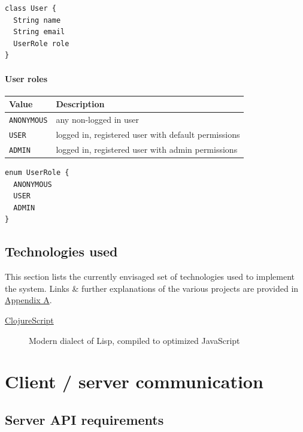 \documentclass[letterpaper, 9pt, onecolumn, twoside, technote, final]{IEEEtran}
\begin{document}
\lstset{language=plantuml,label= ,caption= ,captionpos=b,numbers=none}
\begin{lstlisting}
class User {
  String name
  String email
  UserRole role
}
\end{lstlisting}

\paragraph{User roles}
\label{sec:orgaaad5df}

\begin{center}
\begin{tabular}{ll}
\textbf{Value} & \textbf{Description}\\
\hline
\texttt{ANONYMOUS} & any non-logged in user\\
\texttt{USER} & logged in, registered user with default permissions\\
\texttt{ADMIN} & logged in, registered user with admin permissions\\
\end{tabular}
\end{center}

\lstset{language=plantuml,label= ,caption= ,captionpos=b,numbers=none}
\begin{lstlisting}
enum UserRole {
  ANONYMOUS
  USER
  ADMIN
}
\end{lstlisting}

\subsection{Technologies used}
\label{sec:org1c4b5ec}

This section lists the currently envisaged set of technologies used to
implement the system. Links \& further explanations of the various
projects are provided in \hyperref[sec:org101d683]{Appendix A}.

\begin{description}
\item[{\href{https://github.com/clojure/clojurescript}{ClojureScript}}] Modern dialect of Lisp, compiled to
optimized JavaScript
\end{description}
\section{Client / server communication}
\label{sec:orge25b676}

\subsection{Server API requirements}
\label{sec:orgcc56e11}
\end{document}
